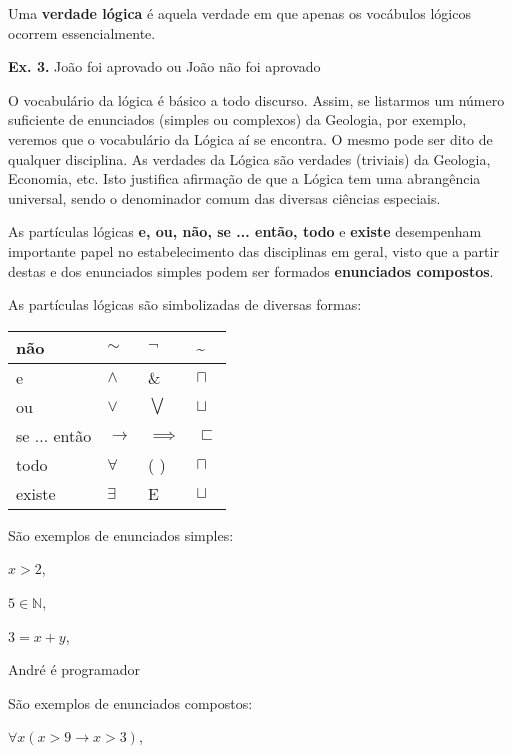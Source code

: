 Uma \textbf{verdade lógica} é aquela verdade em que apenas os vocábulos lógicos ocorrem essencialmente.

\noindent \textbf{Ex. 3.} João foi aprovado ou João não foi aprovado

O vocabulário da lógica é básico a todo discurso.
Assim, se listarmos um número suficiente de enunciados (simples ou complexos) da Geologia, por exemplo, veremos que o vocabulário da Lógica aí se encontra.
O mesmo pode ser dito de qualquer disciplina.
As verdades da Lógica são verdades (triviais) da Geologia, Economia, etc.
Isto justifica afirmação de que a Lógica tem uma abrangência universal, sendo o denominador comum das diversas ciências especiais.

As partículas lógicas \textbf{e, ou, não, se ... então, todo} e \textbf{existe} desempenham importante papel no estabelecimento das disciplinas em geral, visto que a partir destas e dos enunciados simples podem ser formados \textbf{enunciados compostos}.

As partículas lógicas são simbolizadas de diversas formas:
\bigskip
\begin{center}
    \large
    \begin{tabular}{l l l l}
        não          & $\sim$   & $\neg$  & \textasciitilde \\ \hline
        e            & $\land$ & \& & $\sqcap$ \\ \hline
        ou           & $\lor$   & $\bigvee$  & $\sqcup$ \\ \hline
        se ... então & $\to$ & $\implies$ & $\sqsubset$  \\ \hline
        todo         & $\forall$  & \small( \small) & \LARGE{$\sqcap$} \\ \hline
        existe       & $\exists$ & E & \LARGE{$\sqcup$}  \\ \hline
    \end{tabular}
\end{center}

\bigskip \noindent
São exemplos de enunciados simples:

\hskip 2.6cm $x > 2$,

\hskip 2.5cm $5 \in \mathbb{N}$,

\hskip 2.5cm $ 3 = x + y$,

\hskip 2.5cm André é programador

\bigskip \noindent
São exemplos de enunciados compostos:

\hskip 2.5cm $\forall x(x > 9 \to x > 3)$,

